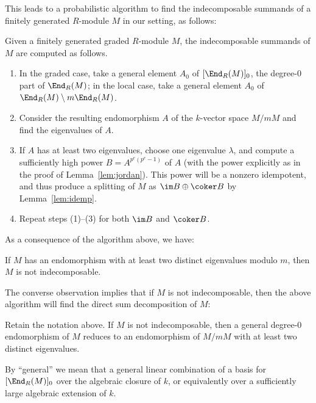 \documentclass[12pt]{article}
\let\l\lambda
\numberwithin{equation}{section}
\theoremstyle{theorem}
\numberwithin{thm}{section}
\theoremstyle{definition}
\begin{document}
This leads to a probabilistic algorithm to find the indecomposable summands of a finitely generated $R$-module $M$ in our setting, as follows:

\begin{alg} Given a finitely generated graded $R$-module $M$, the indecomposable summands of $M$ are computed as follows.
  \begin{enumerate}
  \item\label{item:End0} In the graded case, take a general element $A_0$ of $[\End_R(M)]_0$, the degree-0 part of $\End_R(M)$; in the local case, take a general element $A_0$ of $\End_R(M) \setminus m \End_R(M)$.
  \item Consider the resulting endomorphism $A$ of the $k$-vector space $M/mM$ and find the eigenvalues of $A$.
  \item If $A$ has at least two eigenvalues, choose one eigenvalue $\l$, and compute a sufficiently high power $B=A^{p^e(p^{e}-1)}$ of $A$ (with the power explicitly as in the proof of Lemma~\ref{lem:jordan}). This power will be a nonzero idempotent, and thus produce a splitting of $M$ as $\im B \oplus \coker B$ by Lemma~\ref{lem:idemp}.
  \item Repeat steps (1)--(3) for both $\im B$ and $\coker B$.
  \end{enumerate}
\end{alg}

As a consequence of the algorithm above, we have:

\begin{lem}
If $M$ has an endomorphism with at least two distinct eigenvalues modulo $m$, then $M$ is not indecomposable.
\end{lem}

The converse observation implies that if $M$ is not indecomposable, then the above algorithm will find the direct sum decomposition of $M$:

\begin{lem}
Retain the notation above.
  If $M$ is not indecomposable, then a general degree-0 endomorphism of $M$ reduces to an endomorphism of $M/mM$ with at least two distinct eigenvalues.
\end{lem}

\begin{rem}
  By ``general'' we mean that a general linear combination of a basis for $[\End_R(M)]_0$ over the algebraic closure of $k$, or equivalently over a sufficiently large algebraic extension of $k$.
\end{rem}
\end{document}
